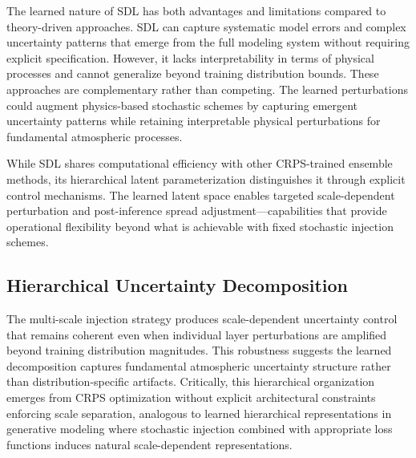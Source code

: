 \documentclass{agujournal2019}
\begin{document}
The learned nature of SDL has both advantages and limitations compared to theory-driven approaches. SDL can capture systematic model errors and complex uncertainty patterns that emerge from the full modeling system without requiring explicit specification. However, it lacks interpretability in terms of physical processes and cannot generalize beyond training distribution bounds. These approaches are complementary rather than competing. The learned perturbations could augment physics-based stochastic schemes by capturing emergent uncertainty patterns while retaining interpretable physical perturbations for fundamental atmospheric processes.

While SDL shares computational efficiency with other CRPS-trained ensemble methods, its hierarchical latent parameterization distinguishes it through explicit control mechanisms. The learned latent space enables targeted scale-dependent perturbation and post-inference spread adjustment—capabilities that provide operational flexibility beyond what is achievable with fixed stochastic injection schemes.


\subsection{Hierarchical Uncertainty Decomposition}

The multi-scale injection strategy produces scale-dependent uncertainty control that remains coherent even when individual layer perturbations are amplified beyond training distribution magnitudes. This robustness suggests the learned decomposition captures fundamental atmospheric uncertainty structure rather than distribution-specific artifacts. Critically, this hierarchical organization emerges from CRPS optimization without explicit architectural constraints enforcing scale separation, analogous to learned hierarchical representations in generative modeling \cite{karras2019style, karras2020analyzing} where stochastic injection combined with appropriate loss functions induces natural scale-dependent representations.
\end{document}
